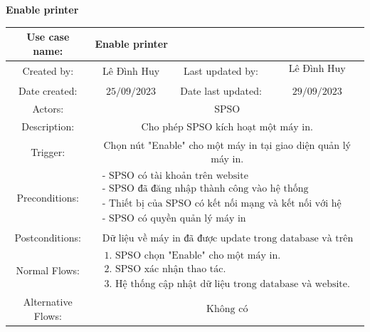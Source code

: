 \vspace{1cm}
\textbf{Enable printer}\par
\begin{tabular}{|c|c|c|c|}
\hline Use case name: & \multicolumn{3}{|l|}{ Enable printer} \\
\hline Created by: & Lê Đình Huy & Last updated by: & $\begin{array}{l}\text { Lê Đình Huy } \\\end{array}$ \\
\hline Date created: & $25 / 09 / 2023$ & Date last updated: & $29 / 09 / 2023$\\
\hline Actors: & \multicolumn{3}{|c|}{ SPSO } \\
\hline Description: & \multicolumn{3}{|c|}{$\begin{array}{l}\text { Cho phép SPSO kích hoạt một máy in. }\end{array}$} \\
\hline Trigger: & \multicolumn{3}{|c|}{ Chọn nút "Enable" cho một máy in tại giao diện quản lý máy in. } \\
\hline Preconditions: & \multicolumn{3}{|c|}{$\begin{array}{l}\text { - SPSO có tài khoản trên website } \\
\text { - SPSO đã đăng nhập thành công vào hệ thống } \\
\text { - Thiết bị của SPSO có kết nối mạng và kết nối với hệ thống }\\
\text { - SPSO có quyền quản lý máy in }\end{array}$} \\
\hline Postconditions: & \multicolumn{3}{|c|}{$\begin{array}{l}\text { Dữ liệu về máy in đã được update trong database và trên giao diện website.} \end{array}$} \\
\hline Normal Flows: & \multicolumn{3}{|c|}{$\begin{array}{l}\text { 1. SPSO chọn "Enable" cho một máy in.} \\
\text { 2. SPSO xác nhận thao tác. } \\
\text { 3. Hệ thống cập nhật dữ liệu trong database và website. }\end{array}$} \\
\hline  Alternative Flows: & \multicolumn{3}{|c|}{$\begin{array}{l} 
\text {Không có}\end{array}$} \\

\end{tabular}
